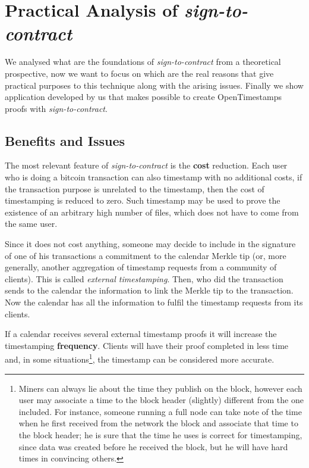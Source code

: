 \chapter{Practical Analysis of \textit{sign-to-contract} }
\label{chpr:s2c}
We analysed what are the foundations of \textit{sign-to-contract} from a theoretical prospective, now we want to focus on which are the real reasons that give practical purposes to this technique along with the arising issues.
Finally we show application developed by us that makes possible to create OpenTimestamps proofs with \textit{sign-to-contract}.

\section{Benefits and Issues}
The most relevant feature of \textit{sign-to-contract} is the \textbf{cost} reduction. Each user who is doing a bitcoin transaction can also timestamp with no additional costs, if the transaction purpose is unrelated to the timestamp, then the cost of timestamping is reduced to zero. Such timestamp may be used to prove the existence of an arbitrary high number of files, which does not have to come from the same user.

Since it does not cost anything, someone may decide to include in the signature of one of his transactions a commitment to the calendar Merkle tip (or, more generally, another aggregation of timestamp requests from a community of clients). 
This is called \textit{external timestamping}.
Then, who did the transaction sends to the calendar the information to link the Merkle tip to the transaction.
Now the calendar has all the information to fulfil the timestamp requests from its clients.

If a calendar receives several external timestamp proofs it will increase the timestamping \textbf{frequency}. Clients will have their proof completed in less time and, in some situations\footnote{Miners can always lie about the time they publish on the block, however each user may associate a time to the block header (slightly) different from the one included. For instance, someone running a full node can take note of the time when he first received from the network the block and associate that time to the block header; he is sure that the time he uses is correct for timestamping, since data was created before he received the block, but he will have hard times in convincing others.}, the timestamp can be considered more accurate.

